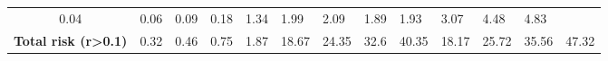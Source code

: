 \begin{table}[H]
{\begin{tabular}{cllll|llll|llll}
            0.04                                               &
            0.06                                               &
            0.09                                               &
            0.18                                               &
            1.34                                               &
            1.99                                               &
            2.09                                               &
            1.89                                               &
            1.93                                               &
            3.07                                               &
            4.48                                               &
            4.83                                                 \\
            \textbf{Total risk (r\textgreater{}0.1)}           &
            0.32                                               &
            0.46                                               &
            0.75                                               &
            1.87                                               &
            18.67                                              &
            24.35                                              &
            32.6                                               &
            40.35                                              &
            18.17                                              &
            25.72                                              &
            35.56                                              &
            47.32                                                \\ \hline
        \end{tabular}%
    }
\end{table}

